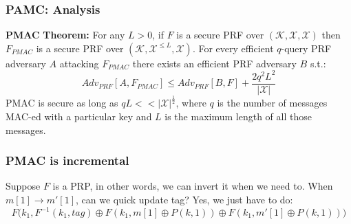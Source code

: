 \documentclass[12pt]{book}
\newcommand{\Thm}{\textbf{Theorem:} }
\begin{document}
\subsubsection{PAMC: Analysis}
\textbf{PMAC} \Thm For any $L>0$, if $F$ is a secure PRF over $(\mathcal{K,X,X})$ then $F_{PMAC}$ is a secure PRF over $(\mathcal{K},\mathcal{X}^{\leq L},\mathcal{X})$. For every efficient $q$-query PRF adversary $A$ attacking $F_{PMAC}$ there exists an efficient PRF adversary $B$ s.t.:
$$Adv_{PRF}[A,F_{PMAC}]\leq Adv_{PRF}[B,F]+\frac{2q^{2}L^{2}}{|\mathcal{X}|}$$PMAC is secure as long as $qL<<|\mathcal{X}|^{\frac{1}{2}}$, where $q$ is the number of messages MAC-ed with a particular key and $L$ is the maximum length of all those messages.

\subsubsection{PMAC is incremental}
Suppose $F$ is a PRP, in other words, we can invert it when we need to. When $m[1]\rightarrow m'[1]$, can we quick update tag? Yes, we just have to do:
$$F\big(k_{1},F^{-1}(k_{1},tag)\oplus F(k_{1},m[1]\oplus P(k,1))\oplus F(k_{1},m'[1]\oplus P(k,1))\big)$$
\end{document}
